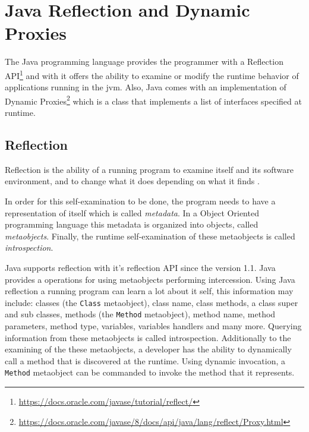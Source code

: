 \section{Java Reflection and Dynamic Proxies}\label{Java Reflection and Dynamic Proxies}
The Java programming language provides the programmer with a Reflection API\footnote{\url{https://docs.oracle.com/javase/tutorial/reflect/}} and with it offers the ability to examine or modify the runtime behavior of applications running in the \ac{jvm}. 
Also, Java comes with an implementation of Dynamic Proxies\footnote{\url{https://docs.oracle.com/javase/8/docs/api/java/lang/reflect/Proxy.html}} which is a class that implements a list of interfaces specified at runtime.

\subsection{Reflection}\label{Reflection}

Reflection is the ability of a running program to examine itself and its software environment, and to change what it does depending on what it finds \cite{forman2004java}.

In order for this self-examination to be done, the program needs to have a representation of itself which is called \textit{metadata}. 
In a Object Oriented programming language this metadata is organized into objects, called \textit{metaobjects}. 
Finally, the runtime self-examination of these metaobjects is called \textit{introspection}.

Java supports reflection with it's reflection API since the version 1.1.
Java provides a operations for using metaobjects performing intercession.
Using Java reflection a running program can learn a lot about it self, this information may include: classes (the \texttt{Class} metaobject), class name, class methods, a class super and sub classes, methods (the \texttt{Method} metaobject), method name, method parameters, method type, variables, variables handlers and many more. Querying information from these metaobjects is called introspection.
Additionally to the examining of the these metaobjects, a developer has the ability to dynamically call a method that is discovered at the runtime. Using dynamic invocation, a \texttt{Method} metaobject can be commanded to invoke the method that it represents. 

